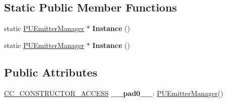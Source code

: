 \subsection*{Static Public Member Functions}
\begin{DoxyCompactItemize}
\item 
\mbox{\label{classPUEmitterManager_a58d7bcb818c306471f5ecbfbe0daad2f}} 
static \hyperlink{classPUEmitterManager}{P\+U\+Emitter\+Manager} $\ast$ {\bfseries Instance} ()
\item 
\mbox{\label{classPUEmitterManager_ac554191e3047e16d03bb4d45902fb538}} 
static \hyperlink{classPUEmitterManager}{P\+U\+Emitter\+Manager} $\ast$ {\bfseries Instance} ()
\end{DoxyCompactItemize}
\subsection*{Public Attributes}
\begin{DoxyCompactItemize}
\item 
\mbox{\label{classPUEmitterManager_aee114ad835d390f4c911e422afe7d84c}} 
\hyperlink{_2cocos2d_2cocos_2base_2ccConfig_8h_a25ef1314f97c35a2ed3d029b0ead6da0}{C\+C\+\_\+\+C\+O\+N\+S\+T\+R\+U\+C\+T\+O\+R\+\_\+\+A\+C\+C\+E\+SS} {\bfseries \+\_\+\+\_\+pad0\+\_\+\+\_\+}\+: \hyperlink{classPUEmitterManager}{P\+U\+Emitter\+Manager}()
\end{DoxyCompactItemize}
